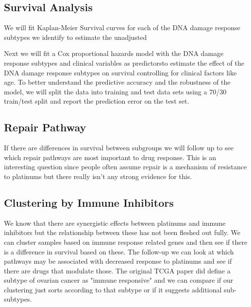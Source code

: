 \documentclass{article}
\begin{document}
\subsection{Survival Analysis}
We will fit Kaplan-Meier Survival curves for each of the DNA damage response subtypes we identify to estimate the unadjusted 

Next we will fit a Cox proportional hazards model with the DNA damage response subtypes and clinical variables as predictorsto estimate the effect of the DNA damage response subtypes on survival controlling for clinical factors like age. To better understand the predictive accuracy and the robustness of the model, we will split the data into training and test data sets using a 70/30 train/test split and report the prediction error on the test set. 

\subsection{Repair Pathway}

If there are differences in survival between subgroups we will follow up to see which repair pathways are most important to drug response. This is an interesting question since people often assume repair is a mechanism of resistance to platinums but there really isn't any strong evidence for this.

\subsection{Clustering by Immune Inhibitors}

We know that there are synergistic effects between platinums and immune inhibitors but the relationship between these has not been fleshed out fully.  We can cluster samples based on immune response related genes and then see if there is a difference in survival based on these. The follow-up we can look at which pathways may be associated with decreased response to platinums and see if there are drugs that modulate those. The original TCGA paper did define a subtype of ovarian cancer as "immune responsive" and we can compare if our clustering just sorts according to that subtype or if it suggests additional sub-subtypes. 

{}

\end{document}
